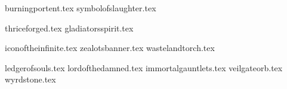 
\raggedcolumns
\begin{multicols}{2}

\subtitle{\weaponenchantments}
\startsortedpricelist

{burningportent.tex}
{symbolofslaughter.tex}

\endsortedpricelist

\subtitle{\armourenchantments}
\startsortedpricelist

{thriceforged.tex}
{gladiatorsspirit.tex}

\endsortedpricelist

\subtitle{\bannerenchantments}

\startsortedpricelistNSP

{iconoftheinfinite.tex}
{zealotsbanner.tex}
{wastelandtorch.tex}

\endsortedpricelistNSP

\subtitle{\artefacts}

\startsortedpricelist

{ledgerofsouls.tex}
{lordofthedamned.tex}
{immortalgauntlets.tex}
{veilgateorb.tex}
{wyrdstone.tex}

\endsortedpricelist
\end{multicols}
